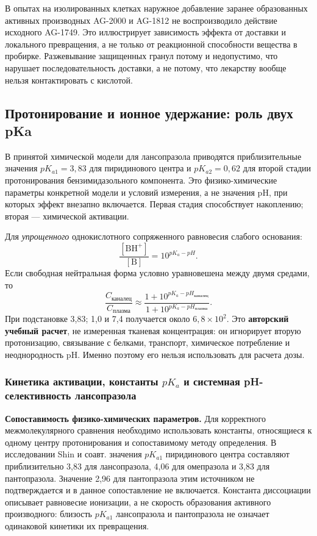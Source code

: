 \documentclass[11pt,a4paper,notitlepage]{report}
\newcommand{\src}[1]{\unskip\space\cite{#1}}
\begin{document}
В опытах на изолированных клетках наружное добавление заранее образованных активных производных AG-2000 и AG-1812 не воспроизводило действие исходного AG-1749. Это иллюстрирует зависимость эффекта от доставки и локального превращения, а не только от реакционной способности вещества в пробирке. Разжевывание защищенных гранул потому и недопустимо, что нарушает последовательность доставки, а не потому, что лекарству вообще нельзя контактировать с кислотой.\src{molnagaya90,uslabel}

\subsection{Протонирование и ионное удержание: роль двух pKa}
В принятой химической модели для лансопразола приводятся приблизительные значения $pK_{a1}=3{,}83$ для пиридинового центра и $pK_{a2}=0{,}62$ для второй стадии протонирования бензимидазольного компонента. Это физико-химические параметры конкретной модели и условий измерения, а не значения pH, при которых эффект внезапно включается. Первая стадия способствует накоплению; вторая --- химической активации.\src{molchem}

Для \emph{упрощенного} однокислотного сопряженного равновесия слабого основания:
\[
\frac{[\mathrm{BH}^{+}]}{[\mathrm{B}]}=10^{pK_a-pH}.
\]
Если свободная нейтральная форма условно уравновешена между двумя средами, то
\[
\frac{C_{\text{каналец}}}{C_{\text{плазма}}}
\approx
\frac{1+10^{pK_a-pH_{\text{каналец}}}}
     {1+10^{pK_a-pH_{\text{плазма}}}}.
\]
При подстановке 3,83; 1,0 и 7,4 получается около $6{,}8\times10^2$. Это \textbf{авторский учебный расчет}, не измеренная тканевая концентрация: он игнорирует вторую протонизацию, связывание с белками, транспорт, химическое потребление и неоднородность pH. Именно поэтому его нельзя использовать для расчета дозы.\src{molchem}

\subsubsection{Кинетика активации, константы \texorpdfstring{$pK_a$}{pKa} и системная pH-селективность лансопразола}
\label{sec:activation-ph-selectivity}

\textbf{Сопоставимость физико-химических параметров.} Для корректного межмолекулярного сравнения необходимо использовать константы, относящиеся к одному центру протонирования и сопоставимому методу определения. В исследовании Shin и соавт. значения $pK_{a1}$ пиридинового центра составляют приблизительно 3,83 для лансопразола, 4,06 для омепразола и 3,83 для пантопразола. Значение 2,96 для пантопразола этим источником не подтверждается и в данное сопоставление не включается. Константа диссоциации описывает равновесие ионизации, а не скорость образования активного производного: близость $pK_{a1}$ лансопразола и пантопразола не означает одинаковой кинетики их превращения.\src{molchem}
\end{document}
